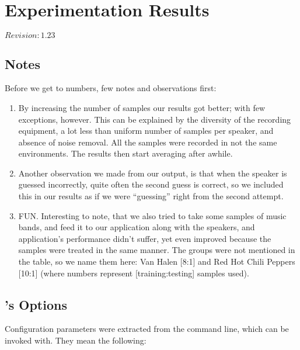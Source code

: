 \chapter{Experimentation Results}
\label{sect:results}

$Revision: 1.23 $

\section{Notes}

Before we get to numbers, few notes and observations first:

\begin{enumerate}

\item By increasing the number of samples our results got
      better; with few exceptions, however. This can be explained by
      the diversity of the recording equipment, a lot less than uniform
      number of samples per speaker, and absence of noise
      removal. All the samples were recorded in not the same environments.
      The results then start averaging after awhile.

\item Another observation we made from our output, is that
      when the speaker is guessed incorrectly, quite often the second
      guess is correct, so we included this in our results as if we were
      ``guessing'' right from the second attempt.

\item FUN. Interesting to note, that we also tried to take some
      samples of music bands, and feed it to our application
      along with the speakers, and application's performance didn't suffer,
      yet even improved because the samples were treated in
      the same manner. The groups were not mentioned in the table,
      so we name them here: Van Halen [8:1] and Red Hot Chili Peppers [10:1] (where numbers
      represent [training:testing] samples used).

\end{enumerate}

\clearpage

\section{'s Options}

Configuration parameters were extracted from the command line,
which  can be invoked with. They mean the following:

